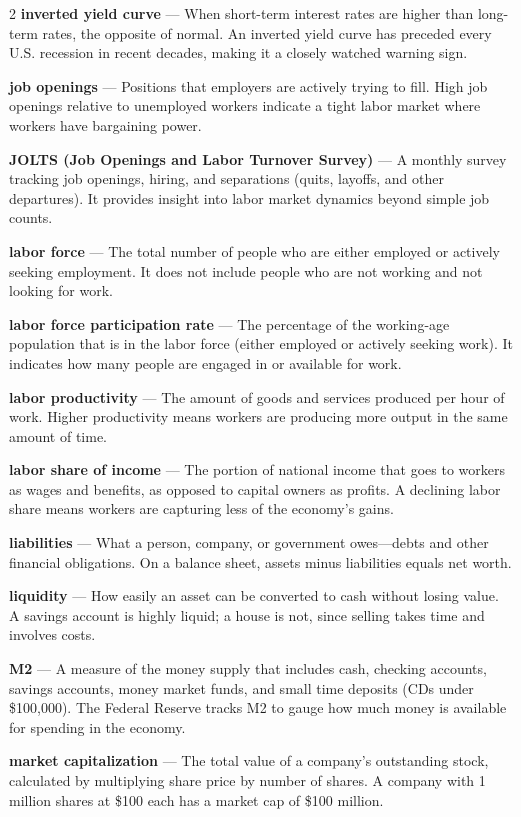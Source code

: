 \begin{multicols}{2}
\textbf{inverted yield curve} --- When short-term interest rates are higher than long-term rates, the opposite of normal. An inverted yield curve has preceded every U.S. recession in recent decades, making it a closely watched warning sign.

\textbf{job openings} --- Positions that employers are actively trying to fill. High job openings relative to unemployed workers indicate a tight labor market where workers have bargaining power.

\textbf{JOLTS (Job Openings and Labor Turnover Survey)} --- A monthly survey tracking job openings, hiring, and separations (quits, layoffs, and other departures). It provides insight into labor market dynamics beyond simple job counts.

\textbf{labor force} --- The total number of people who are either employed or actively seeking employment. It does not include people who are not working and not looking for work.

\textbf{labor force participation rate} --- The percentage of the working-age population that is in the labor force (either employed or actively seeking work). It indicates how many people are engaged in or available for work.

\textbf{labor productivity} --- The amount of goods and services produced per hour of work. Higher productivity means workers are producing more output in the same amount of time.

\textbf{labor share of income} --- The portion of national income that goes to workers as wages and benefits, as opposed to capital owners as profits. A declining labor share means workers are capturing less of the economy's gains.

\textbf{liabilities} --- What a person, company, or government owes---debts and other financial obligations. On a balance sheet, assets minus liabilities equals net worth.

\textbf{liquidity} --- How easily an asset can be converted to cash without losing value. A savings account is highly liquid; a house is not, since selling takes time and involves costs.

\textbf{M2} --- A measure of the money supply that includes cash, checking accounts, savings accounts, money market funds, and small time deposits (CDs under \$100,000). The Federal Reserve tracks M2 to gauge how much money is available for spending in the economy.

\textbf{market capitalization} --- The total value of a company's outstanding stock, calculated by multiplying share price by number of shares. A company with 1 million shares at \$100 each has a market cap of \$100 million.


\end{multicols}
